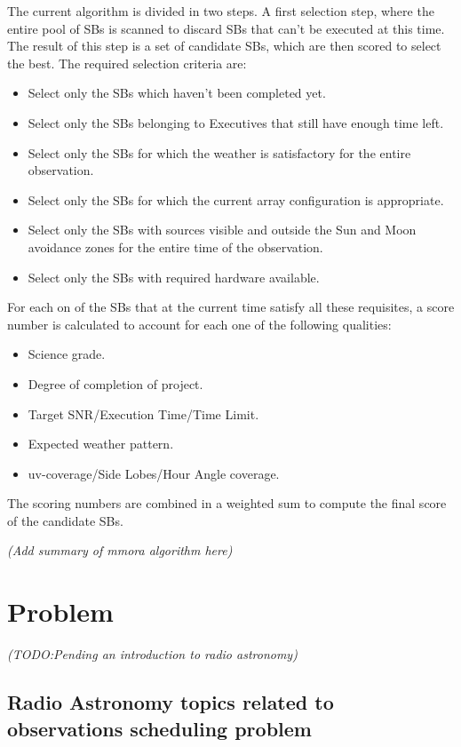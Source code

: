 \documentclass[11pt]{article}
\begin{document}
The current algorithm is divided in two steps. A first selection step, where the entire pool of SBs is scanned to discard SBs that can't be executed at this time. The result of this step is a set of candidate SBs, which are then scored to select the best. The required selection criteria are:
\begin{itemize}
\item Select only the SBs which haven't been completed yet.
\item Select only the SBs belonging to Executives that still have enough time left.
\item Select only the SBs for which the weather is satisfactory for the entire observation.
\item Select only the SBs for which the current array configuration is appropriate.
\item Select only the SBs with sources visible and outside the Sun and Moon avoidance zones for the entire time of the observation.
\item Select only the SBs with required hardware available.
\end{itemize}

For each on of the SBs that at the current time satisfy all these requisites, a score number is calculated to account for each one of the following qualities:
\begin{itemize}
\item Science grade.
\item Degree of completion of project.
\item Target SNR/Execution Time/Time Limit.
\item Expected weather pattern.
\item uv-coverage/Side Lobes/Hour Angle coverage.
\end{itemize}
The scoring numbers are combined in a weighted sum to compute the final score of the
candidate SBs.

\textit{(Add summary of mmora algorithm here)}

\newpage
\section{Problem}
\label{sec:problem}
\textit{(TODO:Pending an introduction to radio astronomy)}
\subsection{Radio Astronomy topics related to observations scheduling problem}
\label{sec:astro-concepts}
\end{document}
